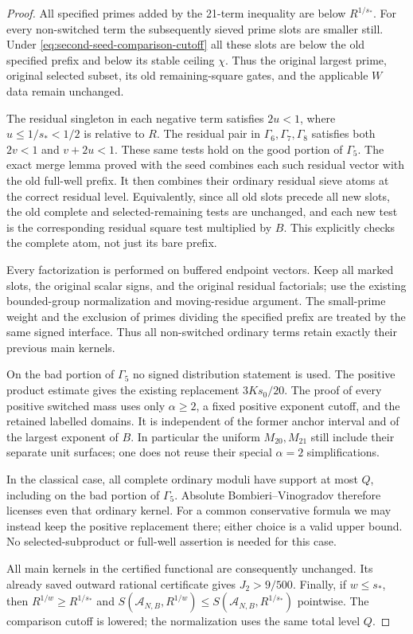 \begin{proof}
All specified primes added by the 21-term inequality are below
$R^{1/s_*}$.  For every non-switched term the subsequently sieved
prime slots are smaller still.  Under
\eqref{eq:second-seed-comparison-cutoff} all these slots are below
the old specified prefix and below its stable ceiling $\chi$.
Thus the original largest prime, original selected subset, its old
remaining-square gates, and the applicable $W$ data remain unchanged.

The residual singleton in each negative term satisfies $2u<1$,
where $u\le1/s_*<1/2$ is relative to $R$.  The residual pair in
$\Gamma_6,\Gamma_7,\Gamma_8$ satisfies both $2v<1$ and $v+2u<1$.
These same tests hold on the good portion of $\Gamma_5$.
The exact merge lemma proved with the seed combines each such
residual vector with the old full-well prefix.  It then combines
their ordinary residual sieve atoms at the correct residual level.
Equivalently, since all old slots precede all new slots, the old
complete and selected-remaining tests are unchanged, and each new
test is the corresponding residual square test multiplied by $B$.
This explicitly checks the complete atom, not just its bare prefix.

Every factorization is performed on buffered endpoint vectors.
Keep all marked slots, the original scalar signs, and the original
residual factorials; use the existing bounded-group normalization
and moving-residue argument.  The small-prime weight and the
exclusion of primes dividing the specified prefix are treated by
the same signed interface.  Thus all non-switched ordinary terms
retain exactly their previous main kernels.

On the bad portion of $\Gamma_5$ no signed distribution statement
is used.  The positive product estimate gives the existing
replacement $3Ks_0/20$.  The proof of every positive switched mass
uses only $\alpha\ge2$, a fixed positive exponent cutoff, and the
retained labelled domains.  It is independent of the former anchor
interval and of the largest exponent of $B$.  In particular the
uniform $M_{20},M_{21}$ still include their separate unit surfaces;
one does not reuse their special $\alpha=2$ simplifications.

In the classical case, all complete ordinary moduli have support
at most $Q$, including on the bad portion of $\Gamma_5$.  Absolute
Bombieri--Vinogradov therefore licenses even that ordinary kernel.
For a common conservative formula we may instead keep the positive
replacement there; either choice is a valid upper bound.  No
selected-subproduct or full-well assertion is needed for this case.

All main kernels in the certified functional are consequently
unchanged.  Its already saved outward rational certificate gives
$J_2>9/500$.  Finally, if $w\le s_*$, then
$R^{1/w}\ge R^{1/s_*}$ and
$S(\mathcal A_{N,B},R^{1/w})\le
S(\mathcal A_{N,B},R^{1/s_*})$ pointwise.  The comparison cutoff
is lowered; the normalization uses the same total level $Q$.
\end{proof}

